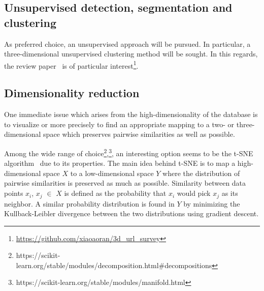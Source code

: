 
\subsection{Unsupervised detection, segmentation and clustering}
As preferred choice, an unsupervised approach will be pursued. In particular, a three-dimensional unsupervised clustering method will be sought. In this regards, the review paper~\cite{xiao2022unsupervised} is of particular interest\footnote{\url{https://github.com/xiaoaoran/3d_url_survey}}.

\subsection{Dimensionality reduction}
One immediate issue which arises from the high-dimensionality of the database is to visualize or more precisely to find an appropriate mapping to a two- or three-dimensional space which preserves pairwise similarities as well as possible. 

Among the wide range of choice\footnote{https://scikit-learn.org/stable/modules/decomposition.html\#decompositions},\footnote{https://scikit-learn.org/stable/modules/manifold.html}, an interesting option seems to be the t-SNE algorithm~\cite{van2008visualizing} due to its properties. The main idea behind t-SNE is to map a high-dimensional space $X$ to a low-dimensional space $Y$ where the distribution of pairwise similarities is preserved as much as possible. Similarity between data points $x_i$, $x_j$ $\in$ $X$ is defined as the probability that $x_i$ would pick $x_j$ as its neighbor. A similar probability distribution is found in $Y$ by minimizing the Kullback-Leibler divergence between the two distributions
using gradient descent. 

